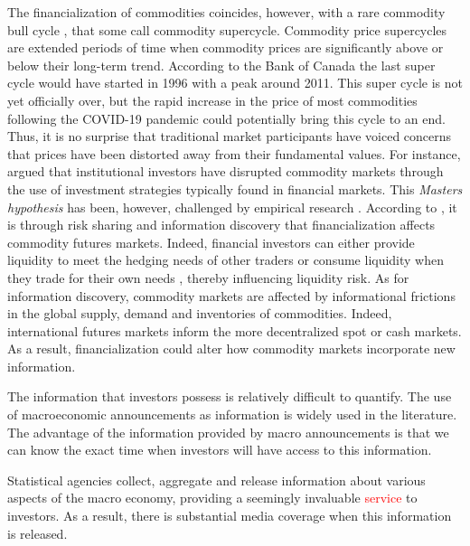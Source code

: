 \documentclass[12pt]{article}
\begin{document}
The financialization of commodities coincides, however, with a rare commodity bull cycle \cite{humphreys2010great}, that some call commodity supercycle. Commodity price supercycles are extended periods of time when commodity prices are significantly above or below their long-term trend. According to the Bank of Canada the last super cycle would have started in 1996 with a peak around 2011. This super cycle is not yet officially over, but the rapid increase in the price of most commodities following the COVID-19 pandemic could potentially bring this cycle to an end. Thus, it is no surprise that traditional market participants have voiced concerns that prices have been distorted  away from their fundamental values. For instance, \citet{masters2009testimony} argued  that institutional investors have disrupted commodity markets through the use of investment strategies typically found in financial markets. This \emph{Masters hypothesis} has been, however, challenged by empirical research \citep{irwin2011index,irwin2012testing,irwin2012financialization}. According to \citet{cheng2014financialization}, it is through risk sharing and information discovery that financialization affects commodity futures markets. Indeed, financial investors can either provide liquidity to meet the hedging needs of other traders or consume liquidity when they trade for their own needs \citep{kang2020tale} , thereby influencing liquidity risk. As for information discovery, commodity markets are affected by informational frictions in the global supply, demand and inventories of commodities. Indeed, international futures markets inform the more decentralized spot or cash markets. As a result, financialization could alter how commodity markets incorporate new information.

The information that investors possess is relatively difficult to quantify. The use of macroeconomic announcements as information is widely used in the literature. The advantage of the information provided by macro announcements is that we can know the exact time when investors will have access to this information.

Statistical agencies collect, aggregate and release information about various aspects of the macro economy, providing a seemingly invaluable \textcolor{red}{service} to investors. As a result, there is substantial media coverage when this information is released.
\end{document}
